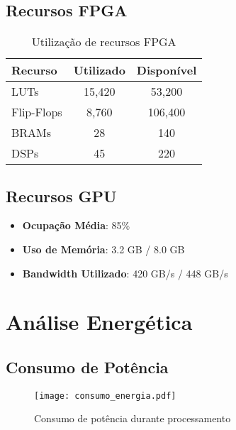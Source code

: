 \subsection{Recursos FPGA}
\begin{table}[!htp]
\caption{Utilização de recursos FPGA}
\label{tab:recursos_fpga}
\begin{center}
\begin{tabular}{lcc}
\toprule
\textbf{Recurso} & \textbf{Utilizado} & \textbf{Disponível} \\
\midrule
LUTs & 15,420 & 53,200 \\
Flip-Flops & 8,760 & 106,400 \\
BRAMs & 28 & 140 \\
DSPs & 45 & 220 \\
\bottomrule
\end{tabular}
\end{center}
\end{table}

\subsection{Recursos GPU}
\begin{itemize}
    \item \textbf{Ocupação Média}: 85\%
    \item \textbf{Uso de Memória}: 3.2 GB / 8.0 GB
    \item \textbf{Bandwidth Utilizado}: 420 GB/s / 448 GB/s
\end{itemize}

\section{Análise Energética}\label{sec:energia}

\subsection{Consumo de Potência}
\begin{figure}[!htb]
\centering
\texttt{[image: consumo\_energia.pdf]}
\caption{Consumo de potência durante processamento}
\label{fig:consumo_energia}
\end{figure}

